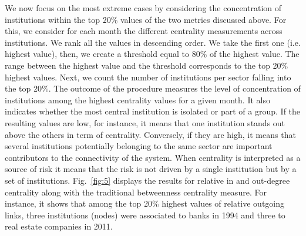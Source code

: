 \documentclass[a4paper,10pt]{article}
\begin{document}
We now focus on the most extreme cases by considering the concentration of institutions within the top 20\% values of the two
metrics discussed above. For this, we consider  for each month the different centrality measurements across institutions. We rank 
all the values in descending order. We take the first one (i.e. highest value), then, we create a threshold equal to 80\% of
the highest value. The range between the highest value and the threshold corresponds to the top 20\% highest values. Next, we
count the number of institutions per sector falling into the top 20\%. The outcome of the procedure measures   the level of 
concentration of institutions among the highest centrality values for a given month.  It also indicates whether the most 
central institution is isolated or part of a group.  If the resulting values are low, for instance, it means that one 
institution stands out above the others in term of centrality. Conversely, if they are high, it means that several 
institutions potentially belonging to the same sector are important contributors to the connectivity of the system.
When centrality is interpreted as a source of risk it means that the risk is not driven by a single institution but by a set
of institutions. Fig.~\ref{fig:5} displays the results for relative in and out-degree centrality along with the traditional 
betweenness centrality measure. For instance, it shows that among the top 20\% highest values of relative outgoing links, three 
institutions (nodes) were associated to banks in 1994 and three to real estate companies in 2011.  
\end{document}
